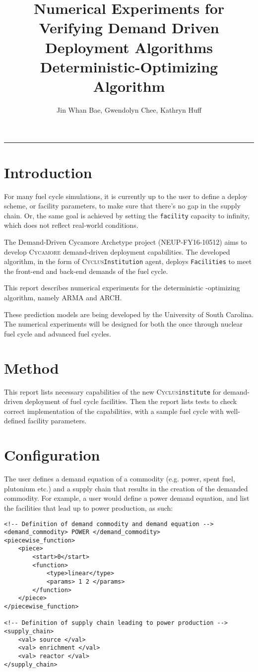 \documentclass[11pt,letterpaper]{article}
\title{Numerical Experiments for Verifying Demand Driven Deployment Algorithms 
        \\ \vspace{0.5em} Deterministic-Optimizing Algorithm}
\author{Jin Whan Bae, Gwendolyn Chee, Kathryn Huff}
\newcommand{\Cyclus}{\textsc{Cyclus}\xspace}%
\newcommand{\Cycamore}{\textsc{Cycamore}\xspace}%
\begin{document}
	\maketitle
	\hrule

\section{Introduction}
For many fuel cycle simulations, it is currently up to the user to define
a deploy scheme, or facility parameters, to make sure that there's no gap
in the supply chain. Or, the same goal is achieved by setting the
\texttt{facility} capacity to infinity, which does not reflect real-world
conditions. 

The Demand-Driven Cycamore Archetype project (NEUP-FY16-10512) aims to develop \Cycamore demand-driven deployment capabilities.
The developed algorithm, in the form of \Cyclus \texttt{Institution}
agent, deploys \texttt{Facilities} to meet the front-end and back-end demands of the 
fuel cycle.

This report describes numerical experiments for the deterministic
-optimizing algorithm, namely \gls{ARMA} and \gls{ARCH}.

These prediction models are being developed by the University of South Carolina. The numerical experiments will be designed for both
 the once through nuclear fuel 
cycle and advanced fuel cycles. 

\section{Method}
This report lists necessary capabilities of the new \Cyclus \texttt{institute}
for demand-driven deployment of fuel cycle facilities. 
Then the report lists tests to check correct implementation of the capabilities,
with a sample fuel cycle with well-defined facility parameters.


\section{Configuration}
The user defines a demand equation of a commodity (e.g. power, spent fuel, plutonium etc.)
and a supply chain that results in the creation of the demanded commodity.
For example, a user would define a power demand equation, and list
the facilities that lead up to power production, as such:

\begin{verbatim}
<!-- Definition of demand commodity and demand equation -->
<demand_commodity> POWER </demand_commodity>
<piecewise_function>
	<piece>
		<start>0</start>
		<function>
			<type>linear</type>
			<params> 1 2 </params>
		</function>
	</piece>
</piecewise_function>

<!-- Definition of supply chain leading to power production -->
<supply_chain>
	<val> source </val>
	<val> enrichment </val>
	<val> reactor </val>
</supply_chain>
\end{verbatim}
\end{document}
